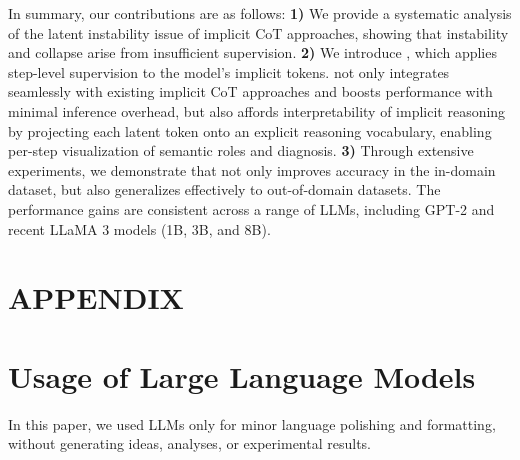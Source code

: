 In summary, our contributions are as follows:  
\textbf{1)} We provide a systematic analysis of the latent instability issue of implicit CoT approaches, showing that instability and collapse arise from insufficient supervision.
\textbf{2)} We introduce \methodname, which applies step-level supervision to the model's implicit tokens. \methodname not only integrates seamlessly with existing implicit CoT approaches and boosts performance with minimal inference overhead, but also affords interpretability of implicit reasoning by projecting each latent token onto an explicit reasoning vocabulary, enabling per-step visualization of semantic roles and diagnosis.
\textbf{3)} Through extensive experiments, we demonstrate that \methodname not only improves accuracy in the in-domain dataset, but also generalizes effectively to out-of-domain datasets. The performance gains are consistent across a range of LLMs, including GPT-2 and recent LLaMA 3 models (1B, 3B, and 8B).

\appendix
\newpage
\section*{\centering APPENDIX}

\section*{Usage of Large Language Models}
In this paper, we used LLMs only for minor language polishing and formatting, without generating ideas, analyses, or experimental results.

